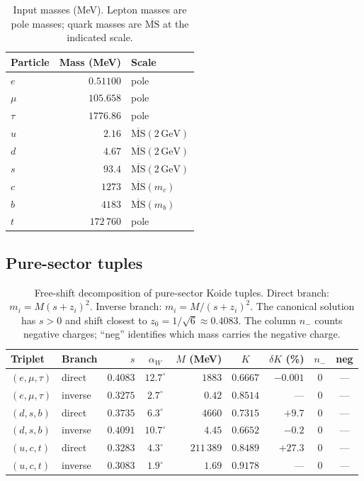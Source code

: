 \documentclass[preprint,12pt]{elsarticle}
\newcommand{\GeV}{\,\mathrm{GeV}}
\begin{document}
\begin{table}[h]
\centering
\caption{Input masses (MeV).  Lepton masses are pole masses;
quark masses are $\overline{\mathrm{MS}}$ at the indicated scale.}
\label{tab:masses}
{\small
\begin{tabular}{lrl}
\toprule
Particle & Mass (MeV) & Scale \\
\midrule
$e$    & $0.51100$   & pole \\
$\mu$  & $105.658$   & pole \\
$\tau$ & $1776.86$   & pole \\
$u$    & $2.16$      & $\overline{\mathrm{MS}}(2\GeV)$ \\
$d$    & $4.67$      & $\overline{\mathrm{MS}}(2\GeV)$ \\
$s$    & $93.4$      & $\overline{\mathrm{MS}}(2\GeV)$ \\
$c$    & $1273$      & $\overline{\mathrm{MS}}(m_c)$ \\
$b$    & $4183$      & $\overline{\mathrm{MS}}(m_b)$ \\
$t$    & $172\,760$  & pole \\
\bottomrule
\end{tabular}}
\end{table}

\subsection{Pure-sector tuples}

\begin{table}[h]
\centering
\caption{Free-shift decomposition of pure-sector Koide tuples.
Direct branch: $m_i = M(s + z_i)^2$.
Inverse branch: $m_i = M/(s + z_i)^2$.
The canonical solution has $s > 0$ and shift
closest to $z_0 = 1/\sqrt{6} \approx 0.4083$.
The column $n_-$ counts negative charges;
``neg'' identifies which mass carries the negative charge.}
\label{tab:pure}
{\small
\begin{tabular}{llrcrcrcc}
\toprule
Triplet & Branch & $s$ & $\alpha_W$ & $M$ (MeV) & $K$ & $\delta K$ (\%) & $n_-$ & neg \\
\midrule
$(e, \mu, \tau)$  & direct  & $0.4083$ & $12.7^\circ$ & $1883$     & $0.6667$ & $-0.001$ & 0 & --- \\
$(e, \mu, \tau)$  & inverse & $0.3275$ & $2.7^\circ$  & $0.42$     & $0.8514$ & ---      & 0 & --- \\
\midrule
$(d, s, b)$       & direct  & $0.3735$ & $6.3^\circ$  & $4660$     & $0.7315$ & $+9.7$ & 0 & --- \\
$(d, s, b)$       & inverse & $0.4091$ & $10.7^\circ$ & $4.45$     & $0.6652$ & $-0.2$ & 0 & --- \\
\midrule
$(u, c, t)$       & direct  & $0.3283$ & $4.3^\circ$  & $211\,389$ & $0.8489$ & $+27.3$ & 0 & --- \\
$(u, c, t)$       & inverse & $0.3083$ & $1.9^\circ$  & $1.69$     & $0.9178$ & ---     & 0 & --- \\
\bottomrule
\end{tabular}}
\end{table}
\end{document}
